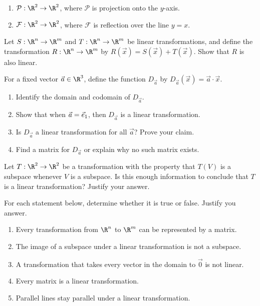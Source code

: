 \begin{exercises}
\begin{problist}
\begin{enumerate}
			\item $\mathcal P:\R^{2}\to\R^{2}$, where $\mathcal P$
				is projection onto the $y$-axis.

			\item $\mathcal F:\R^{2}\to\R^{2}$, where $\mathcal F$
				is reflection over the line
				$y=x$.
		\end{enumerate}

		\prob Let $S:\R^n\to\R^m$ and $T:\R^n\to\R^m$ be linear transformations,
		and define the transformation $R:\R^n\to\R^m$ by $R(\vec x)=S(\vec x)+T(\vec x)$.
		Show that $R$ is also linear.

		\prob For a fixed vector $\vec a\in\R^3$, define the function $D_{\vec a}$ by
		$D_{\vec a}(\vec x) = \vec a\cdot\vec x$.
		\begin{enumerate}
			\item Identify the domain and codomain of $D_{\vec a}$.
			\item Show that when $\vec a={\vec e_1}$, then $D_{\vec a}$ is a linear transformation.
			\item Is $D_{\vec a}$ a linear transformation for all $\vec a$? Prove your claim.
			\item Find a matrix for $D_{\vec a}$ or explain why no such matrix exists.
		\end{enumerate}

		\prob Let $T:\R^2\to\R^2$ be a transformation with the property that $T(V)$ is a subspace
		whenever $V$ is a subspace. Is this enough information to conclude that $T$ is a linear
		transformation? Justify your answer.

		\prob For each statement below, determine whether it is true or false. Justify you answer.
		\begin{enumerate}
			\item Every transformation from $\R^n$ to $\R^m$ can be represented by a matrix.
			\item The image of a subspace under a linear transformation is not a subspace.
			\item A transformation that takes every vector in the domain to $\vec 0$ is not linear.
			\item Every matrix is a linear transformation.
			\item Parallel lines stay parallel under a linear transformation.
		\end{enumerate}

	\end{problist}
\end{exercises}
